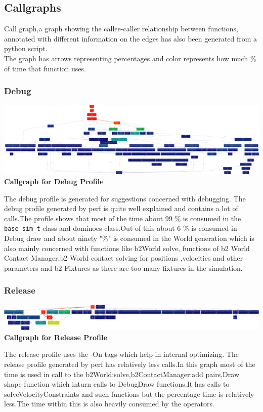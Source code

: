 \documentclass[11pt]{article}
\begin{document}
\subsection{Callgraphs}
Call graph,a graph showing the callee-caller relationship between functions, annotated with different information on the edges has also been generated from a python script.\\
The graph has arrows representing percentages and color represents how much \% of time that function uses.

\subsubsection{Debug}
\begin{center}
  \includegraphics[width=\textwidth,height=\textheight,keepaspectratio]{output_d.png}
  \textbf{Callgraph for Debug Profile}
\end{center}
The debug profile is generated for suggestions concerned with debugging.
The debug profile generated by perf is quite well explained and contains a lot of calls.The profile shows that most of the time about 99 \% is consumed in the \texttt{base\_sim\_t} class and dominoes class.Out of this about 6 \% is consumed in Debug draw and  about ninety "\%" is consumed in the World generation which is also mainly concerned with functions like b2World solve, functions of b2 World Contact Manager,b2 World contact  solving for positions ,velocities and other parameters and b2 Fixtures as there are too many fixtures in the simulation.   
\subsubsection{Release}

\begin{center}
  \includegraphics[width=\textwidth,height=\textheight,keepaspectratio]{output_r.png}
  \textbf{Callgraph for Release Profile}
\end{center}
The release profile uses the -On tags which help in internal optimizing.
The release profile generated by perf has relatively less calls.In this graph most of the time is used in call to the b2World:solve,b2ContactManager:add pairs,Draw shape function which inturn calls to DebugDraw functions.It has calls to solveVelocityConstraints and such functions but the percentage time is relatively less.The time within this  is also heavily consumed by the operators.
\end{document}
